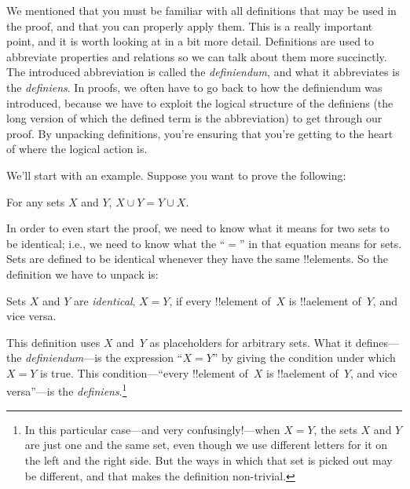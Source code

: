 \documentclass[../../../include/open-logic-section]{subfiles}
\begin{document}


We mentioned that you must be familiar with all definitions that may
be used in the proof, and that you can properly apply them. This is a
really important point, and it is worth looking at in a bit more
detail. Definitions are used to abbreviate properties and relations so
we can talk about them more succinctly. The introduced abbreviation is
called the \emph{definiendum}, and what it abbreviates is the
\emph{definiens}.  In proofs, we often have to go back to how the
definiendum was introduced, because we have to exploit the logical
structure of the definiens (the long version of which the defined term
is the abbreviation) to get through our proof.  By unpacking
definitions, you're ensuring that you're getting to the heart of where
the logical action is.

We'll start with an example. Suppose you want to prove the following:

\begin{prop}
For any sets $X$ and $Y$, $X \cup Y = Y \cup X$.
\end{prop}

In order to even start the proof, we need to know what it means for
two sets to be identical; i.e., we need to know what the ``$=$'' in
that equation means for sets.  Sets are defined to be identical
whenever they have the same !!{element}s.  So the definition we have
to unpack is:

\begin{defn}
Sets $X$ and $Y$ are \emph{identical}, $X = Y$, if every !!{element}
of~$X$ is !!a{element} of~$Y$, and vice versa.
\end{defn}

This definition uses $X$ and~$Y$ as placeholders for arbitrary
sets. What it defines---the \emph{definiendum}---is the expression
``$X = Y$'' by giving the condition under which $X = Y$ is true.  This
condition---``every !!{element} of~$X$ is !!a{element} of~$Y$, and
vice versa''---is the \emph{definiens}.\footnote{In this particular
  case---and very confusingly!---when $X = Y$, the sets $X$ and $Y$
  are just one and the same set, even though we use different letters
  for it on the left and the right side.  But the ways in which that
  set is picked out may be different, and that makes the definition
  non-trivial.}
\end{document}
